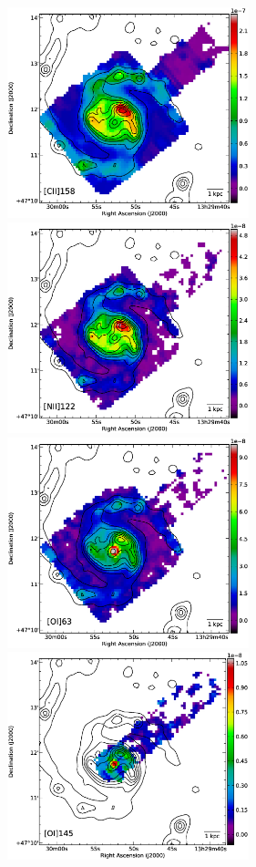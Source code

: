\documentclass[preprint2]{aastex}
\begin{document}
\begin{figure}
 \includegraphics[width=7.0cm]{Figure2a}
 \includegraphics[width=7.0cm]{Figure2b}
 \includegraphics[width=7.0cm]{Figure2c}
 \includegraphics[width=7.0cm]{Figure2d}

\end{figure}
\end{document}
